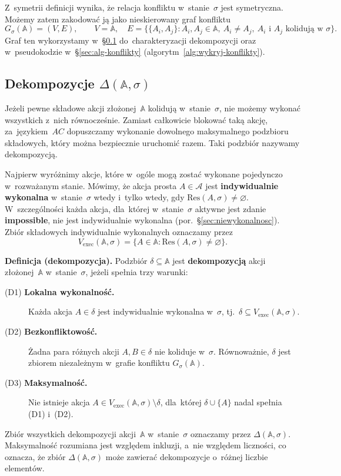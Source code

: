 \documentclass[11pt,a4paper]{article}
\newcommand{\impossible}{\textbf{impossible}}
\theoremstyle{definition}
\begin{document}
Z~symetrii definicji wynika, że relacja konfliktu w~stanie~$\sigma$
jest symetryczna. Możemy zatem zakodować ją jako nieskierowany graf
konfliktu
\[
  G_\sigma(\mathbb{A}) = (V, E),
  \qquad V = \mathbb{A},
  \quad
  E = \{\{A_i, A_j\} : A_i, A_j \in \mathbb{A},\ A_i \neq A_j,
        \ A_i \text{ i } A_j \text{ kolidują w~} \sigma\}.
\]
Graf ten wykorzystamy w~\S\ref{sec:dekompozycje} do~charakteryzacji
dekompozycji oraz w~pseudokodzie w~\S\ref{sec:alg-konflikty} (algorytm~\ref{alg:wykryj-konflikty}).

\subsection{Dekompozycje \texorpdfstring{$\Delta(\mathbb{A}, \sigma)$}{Delta(A,sigma)}}
\label{sec:dekompozycje}

Jeżeli pewne składowe akcji złożonej~$\mathbb{A}$ kolidują w~stanie~$\sigma$,
nie możemy wykonać wszystkich z~nich równocześnie. Zamiast całkowicie
blokować taką akcję, za~językiem~$AC$ dopuszczamy wykonanie dowolnego
maksymalnego podzbioru składowych, który można bezpiecznie uruchomić
razem. Taki podzbiór nazywamy dekompozycją.

Najpierw wyróżnimy akcje, które w~ogóle mogą zostać wykonane pojedynczo
w~rozważanym stanie. Mówimy, że akcja prosta $A \in \mathcal{A}$ jest
\textbf{indywidualnie wykonalna} w~stanie~$\sigma$ wtedy i~tylko wtedy,
gdy $\mathrm{Res}(A,\sigma) \neq \varnothing$. W~szczególności każda
akcja, dla~której w~stanie~$\sigma$ aktywne jest zdanie \impossible{},
nie jest indywidualnie wykonalna (por.~§\ref{sec:niewykonalnosc}). Zbiór składowych
indywidualnie wykonalnych oznaczamy przez
\[
  V_{\mathrm{exec}}(\mathbb{A},\sigma)
    = \{A \in \mathbb{A} : \mathrm{Res}(A,\sigma) \neq \varnothing\}.
\]

\medskip
\noindent \textbf{Definicja (dekompozycja).}
Podzbiór $\delta \subseteq \mathbb{A}$ jest \textbf{dekompozycją} akcji
złożonej~$\mathbb{A}$ w~stanie~$\sigma$, jeżeli spełnia trzy warunki:
\begin{description}
  \item[(D1) \textbf{Lokalna wykonalność.}]
        Każda akcja $A \in \delta$ jest indywidualnie wykonalna w~$\sigma$,
        tj.\ $\delta \subseteq V_{\mathrm{exec}}(\mathbb{A},\sigma)$.
  \item[(D2) \textbf{Bezkonfliktowość.}]
        Żadna para różnych akcji $A, B \in \delta$ nie koliduje w~$\sigma$.
        Równoważnie, $\delta$ jest zbiorem niezależnym w~grafie konfliktu
        $G_\sigma(\mathbb{A})$.
  \item[(D3) \textbf{Maksymalność.}]
        Nie istnieje akcja $A \in V_{\mathrm{exec}}(\mathbb{A},\sigma) \setminus \delta$,
        dla~której $\delta \cup \{A\}$ nadal spełnia (D1) i~(D2).
\end{description}
Zbiór wszystkich dekompozycji akcji~$\mathbb{A}$ w~stanie~$\sigma$
oznaczamy przez $\Delta(\mathbb{A},\sigma)$. Maksymalność rozumiana jest
względem inkluzji, a~nie względem liczności, co oznacza, że zbiór
$\Delta(\mathbb{A},\sigma)$ może zawierać dekompozycje o~różnej liczbie
elementów.
\end{document}
